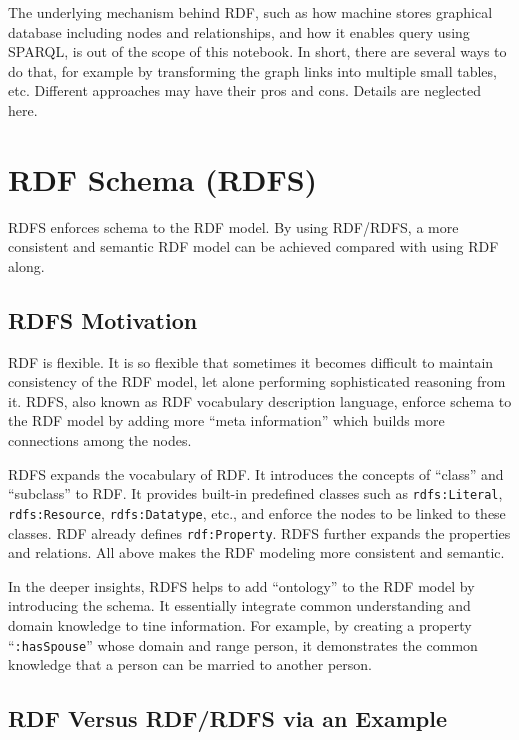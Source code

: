 The underlying mechanism behind RDF, such as how machine stores graphical database including nodes and relationships, and how it enables query using SPARQL, is out of the scope of this notebook. In short, there are several ways to do that, for example by transforming the graph links into multiple small tables, etc. Different approaches may have their pros and cons. Details are neglected here.

\section{RDF Schema (RDFS)}

RDFS enforces schema to the RDF model. By using RDF/RDFS, a more consistent and semantic RDF model can be achieved compared with using RDF along.

\subsection{RDFS Motivation}

RDF is flexible. It is so flexible that sometimes it becomes difficult to maintain consistency of the RDF model, let alone performing sophisticated reasoning from it. RDFS, also known as RDF vocabulary description language, enforce schema to the RDF model by adding more ``meta information'' which builds more connections among the nodes.

RDFS expands the vocabulary of RDF. It introduces the concepts of ``class'' and ``subclass'' to RDF. It provides built-in predefined classes such as \verb|rdfs:Literal|, \verb|rdfs:Resource|, \verb|rdfs:Datatype|, etc., and enforce the nodes to be linked to these classes. RDF already defines \verb|rdf:Property|. RDFS further expands the properties and relations. All above makes the RDF modeling more consistent and semantic.

In the deeper insights, RDFS helps to add ``ontology'' to the RDF model by introducing the schema. It essentially integrate common understanding and domain knowledge to tine information. For example, by creating a property ``\verb|:hasSpouse|'' whose domain and range person, it demonstrates the common knowledge that a person can be married to another person.

\subsection{RDF Versus RDF/RDFS via an Example} \label{subsec:rdfvsrdfs}

